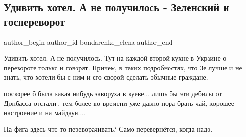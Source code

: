  
 
 
 
 
 
\subsection{Удивить хотел. А не получилось - Зеленский и госпереворот}
\label{sec:26_11_2021.fb.bondarenko_elena.1.gosperevorot_kuhnja}
 
\ifcmt
 author_begin
   author_id bondarenko_elena
 author_end
\fi

Удивить хотел. А не получилось. Тут на каждой второй кухне в Украине о
перевороте только и говорят.  Причем, в таких подробностях, что Зе лучше и не
знать, что хотели бы с ним и его сворой сделать обычные граждане.

\begin{cmtfront}

поскорее б была какая нибудь заворуха в куеве... лишь бы эти дебилы от Донбасса
отстали.. тем более по времени уже давно пора брать чай, хорошее настроение и
на майдаун....


На фига здесь что-то переворачивать? Само перевернётся, когда надо.
	
\end{cmtfront}


